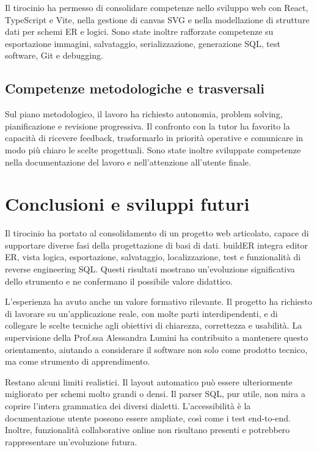 \documentclass{unipd-thesis-modern}
\newcommand{\builder}{buildER}
\begin{document}
Il tirocinio ha permesso di consolidare competenze nello sviluppo web con React, TypeScript e Vite, nella gestione di canvas SVG e nella modellazione di strutture dati per schemi ER e logici. Sono state inoltre rafforzate competenze su esportazione immagini, salvataggio, serializzazione, generazione SQL, test software, Git e debugging.

\section{Competenze metodologiche e trasversali}

Sul piano metodologico, il lavoro ha richiesto autonomia, problem solving, pianificazione e revisione progressiva. Il confronto con la tutor ha favorito la capacità di ricevere feedback, trasformarlo in priorità operative e comunicare in modo più chiaro le scelte progettuali. Sono state inoltre sviluppate competenze nella documentazione del lavoro e nell'attenzione all'utente finale.

\chapter{Conclusioni e sviluppi futuri}

Il tirocinio ha portato al consolidamento di un progetto web articolato, capace di supportare diverse fasi della progettazione di basi di dati. \builder{} integra editor ER, vista logica, esportazione, salvataggio, localizzazione, test e funzionalità di reverse engineering SQL. Questi risultati mostrano un'evoluzione significativa dello strumento e ne confermano il possibile valore didattico.

L'esperienza ha avuto anche un valore formativo rilevante. Il progetto ha richiesto di lavorare su un'applicazione reale, con molte parti interdipendenti, e di collegare le scelte tecniche agli obiettivi di chiarezza, correttezza e usabilità. La supervisione della Prof.ssa Alessandra Lumini ha contribuito a mantenere questo orientamento, aiutando a considerare il software non solo come prodotto tecnico, ma come strumento di apprendimento.

Restano alcuni limiti realistici. Il layout automatico può essere ulteriormente migliorato per schemi molto grandi o densi. Il parser SQL, pur utile, non mira a coprire l'intera grammatica dei diversi dialetti. L'accessibilità è la documentazione utente possono essere ampliate, così come i test end-to-end. Inoltre, funzionalità collaborative online non risultano presenti e potrebbero rappresentare un'evoluzione futura.
\end{document}
